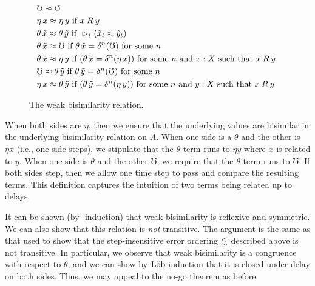 \begin{figure}
    \begin{align*}
        &\mho \approx \mho \\
        &\eta\, x \approx \eta\, y \text{ if } 
          x \mathbin{R} y \\
        &\theta\, \tilde{x} \approx \theta\, \tilde{y} \text{ if } 
          \vartriangleright_t (\tilde{x}_t \approx \tilde{y}_t) \\
        &\theta\, \tilde{x} \approx \mho \text{ if } 
          \theta\, \tilde{x} = \delta^n(\mho) \text { for some $n$ } \\
        &\theta\, \tilde{x} \approx \eta\, y \text{ if }
          (\theta\, \tilde{x} = \delta^n(\eta\, x))
        \text { for some $n$ and $x : X$ such that $x \mathbin{R} y$ } \\
        &\mho \approx \theta\, \tilde{y} \text { if } 
          \theta\, \tilde{y} = \delta^n(\mho) \text { for some $n$ } \\
        &\eta\, x \approx \theta\, \tilde{y} \text { if }
          (\theta\, \tilde{y} = \delta^n (\eta\, y))
        \text { for some $n$ and $y : X$ such that $x \mathbin{R} y$ }
      \end{align*}
    \caption{The weak bisimilarity relation.}
    \label{fig:weak-bisimilarity}
\end{figure}

When both sides are $\eta$, then we ensure that the underlying values are
bisimilar in the underlying bisimilarity relation on $A$. When one side is a
$\theta$ and the other is $\eta x$ (i.e., one side steps), we stipulate that the
$\theta$-term runs to $\eta y$ where $x$ is related to $y$. When one side is
$\theta$ and the other $\mho$, we require that the $\theta$-term runs to $\mho$.
If both sides step, then we allow one time step to pass and compare the
resulting terms. This definition captures the intuition of two terms being
related up to delays.

It can be shown (by \lob-induction) that weak bisimilarity is reflexive and
symmetric. We can also show that this relation is \emph{not} transitive. The
argument is the same as that used to show that the step-insensitive error
ordering $\lesssim$ described above is not transitive. In particular, we
observe that weak bisimilarity is a congruence with respect to $\theta$, and we
can show by $\text{L\"{o}b}$-induction that it is closed under delay on both sides. Thus,
we may appeal to the no-go theorem as before.

